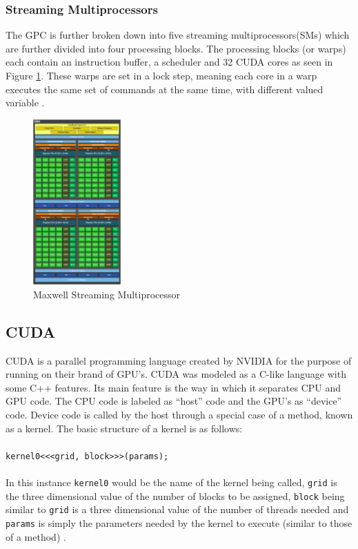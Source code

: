 \subsubsection{Streaming Multiprocessors}\label{gpu:ssec:smm}
The GPC is further broken down into five streaming multiprocessors(SMs) which are further divided into four processing blocks. The processing blocks (or warps) each contain an instruction buffer, a scheduler and 32 CUDA cores as seen in Figure \ref{gpu:img:smm}. These warps are set in a lock step, meaning each core in a warp executes the same set of commands at the same time, with different valued variable \citep{CUDA}.
%
\begin{figure}[H]
\centering
 \includegraphics[width=0.3\textwidth]{Images/GM107SMM.png}
 \caption[]{Maxwell Streaming Multiprocessor\footnotemark}
 \label{gpu:img:smm}
\end{figure}
\subsection{CUDA}\label{gpu:sec:cuda}
CUDA is a parallel programming language created by NVIDIA for the purpose of running on their brand of GPU's. CUDA was modeled as a C-like language with some C++ features. Its main feature is the way in which it separates CPU and GPU code. The CPU code is labeled as ``host'' code and the GPU's as ``device'' code. Device code is called by the host through a special case of a method, known as a kernel. The basic structure of a kernel is as follows: 
\\
\\
\texttt{kernel0<<<grid, block>>>(params);}
\\
\\
In this instance \texttt{kernel0} would be the name of the kernel being called, \texttt{grid} is the three dimensional value of the number of blocks to be assigned, \texttt{block} being similar to \texttt{grid} is a three dimensional value of the number of threads needed and \texttt{params} is simply the parameters needed by the kernel to execute (similar to those of a method) \citep{CUDA}.
%
